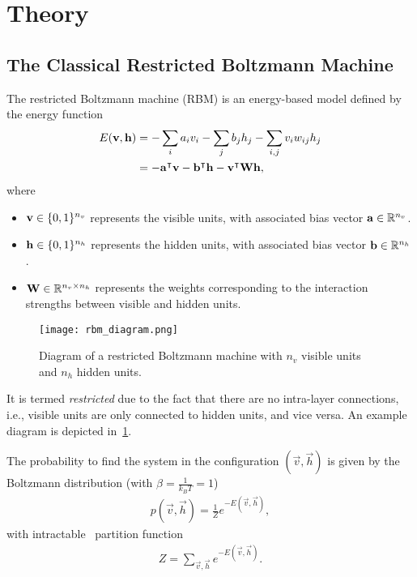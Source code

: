 \section{Theory}
\subsection{The Classical Restricted Boltzmann Machine}
The restricted Boltzmann machine (RBM) is an energy-based model defined by the energy function~\cite{goodfellow_deep_learning}
\begin{align}
\begin{split}
    E(\mathbf{v}, \mathbf{h})
        &= -\sum_i a_i v_i - \sum_j b_j h_j - \sum_{i,j} v_i w_{ij} h_j \\
        &= -\mathbf{a}^\intercal\mathbf{v} - \mathbf{b}^\intercal\mathbf{h} - \mathbf{v}^\intercal\mathbf{W}\mathbf{h},
\end{split}
\end{align}
where
\begin{itemize}
    \item \( \mathbf{v} \in \{0,1\}^{n_v} \) represents the visible units, with associated bias vector \( \mathbf{a} \in \mathbb{R}^{n_v} \).
    \item \( \mathbf{h} \in \{0,1\}^{n_h} \) represents the hidden units, with associated bias vector \( \mathbf{b} \in \mathbb{R}^{n_h} \).
    \item \( \mathbf{W} \in \mathbb{R}^{n_v \times n_h} \) represents the weights corresponding to the interaction strengths between visible and hidden units.
\end{itemize}

\begin{figure}[!htb]
    \begin{center}
        \texttt{[image: rbm\_diagram.png]}
    \end{center}
    \caption{Diagram of a restricted Boltzmann machine with \( n_v \) visible units and \( n_h \) hidden units.}
    \label{fig:rbm_diagram}
\end{figure}

It is termed \textit{restricted} due to the fact that there are no intra-layer connections, i.e., visible units are only connected to hidden units, and vice versa.
An example diagram is depicted in~\cref{fig:rbm_diagram}.

The probability to find the system in the configuration \( (\vec{v},\vec{h}) \) is given by the Boltzmann distribution (with \( \beta = \frac{1}{k_BT} = 1 \))
\begin{align}
    p(\vec{v}, \vec{h}) = \frac{1}{Z} e^{-E(\vec{v},\vec{h})},
\end{align}
with intractable~\cite{long_servedio_2010} partition function
\begin{align}
    Z = \sum_{\vec{v},\vec{h}} e^{-E(\vec{v},\vec{h})}.
\end{align}

